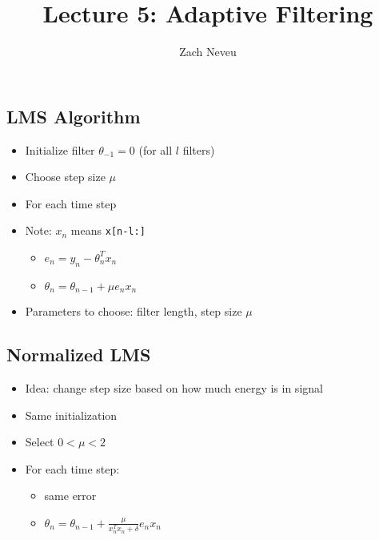 \documentclass[12pt, letter]{article}
\author{Zach Neveu}
\title{ Lecture 5: Adaptive Filtering }
\begin{document}
\maketitle

\subsection*{LMS Algorithm}
\begin{itemize}
\item Initialize filter $\theta_{-1} = 0$ (for all $l$ filters)
	 \item Choose step size $\mu$
	 \item For each time step
	 \item Note: $x_n$ means \texttt{x[n-l:]}
	 \begin{itemize}
	 \item $e_n = y_n - \theta_n^Tx_n$
	 \item $\theta_n = \theta_{n-1}+\mu e_n x_n$
	 \end{itemize}
	 \item Parameters to choose: filter length, step size $\mu$
	 \end{itemize}

	 \subsection*{Normalized LMS}
	 \begin{itemize}
	 \item Idea: change step size based on how much energy is in signal
	 \item Same initialization
	 \item Select $0 < \mu < 2$
	 \item For each time step:
	 \begin{itemize}
	 \item same error
	 \item $\theta_n = \theta_{n-1} + \frac{\mu}{x^T_nx_n+\delta} e_nx_n$
	 \end{itemize}
	 \end{itemize}
\end{document}
